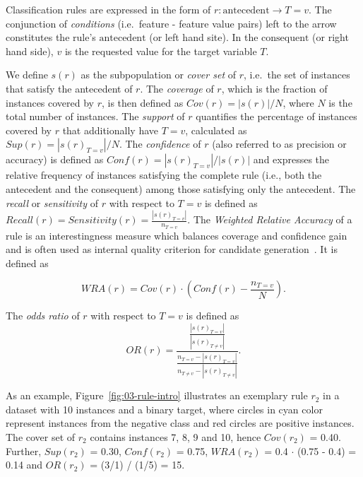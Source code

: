 \documentclass[
  oneside]{book}
\begin{document}
Classification rules are expressed in the form of \(r: \text{antecedent} \longrightarrow T=v\).
The conjunction of \emph{conditions} (i.e.~feature - feature value pairs) left to the arrow constitutes the rule's \(\text{antecedent}\) (or left hand site).
In the \(\text{consequent}\) (or right hand side), \(v\) is the requested value for the target variable \(T\).

We define \(s(r)\) as the subpopulation or \emph{cover set} of \(r\), i.e.~the set of instances that satisfy the antecedent of \(r\).
The \emph{coverage} of \(r\), which is the fraction of instances covered by \(r\), is then defined as \(Cov(r)=|s(r)|/N\), where \(N\) is the total number of instances.
The \emph{support} of \(r\) quantifies the percentage of instances covered by \(r\) that additionally have \(T=v\), calculated as \(Sup(r)=|s(r)_{T=v}|/N\).
The \emph{confidence} of \(r\) (also referred to as precision or accuracy) is defined as \(Conf(r)= |s(r)_{T=v}|/|s(r)|\) and expresses the relative frequency of instances satisfying the complete rule (i.e., both the antecedent and the consequent) among those satisfying only the antecedent.
The \emph{recall} or \emph{sensitivity} of \(r\) with respect to \(T=v\) is defined as \(Recall(r)=Sensitivity(r)=\frac{|s(r)_{T=v}|}{n_{T=v}}\).
The \emph{Weighted Relative Accuracy} of a rule is an interestingness measure which balances coverage and confidence gain and is often used as internal quality criterion for candidate generation~\autocite{Herrera11}.
It is defined as

\begin{equation}
WRA(r) = Cov(r)\cdot \left(Conf(r)-\frac{n_{T=v}}{N} \right).
\label{eq:03-wra}
\end{equation}

The \emph{odds ratio} of \(r\) with respect to \(T=v\) is defined as
\begin{equation}
OR(r) = \frac{\frac{ |s(r)_{T=v}| }{|s(r)_{T\neq v}|} }{ \frac{n_{T=v} -  |s(r)_{T=v}| }{ n_{T\neq v} -  |s(r)_{T\neq v}|} }.
\label{eq:03-odds}
\end{equation}

As an example, Figure~\ref{fig:03-rule-intro} illustrates an exemplary rule \(r_2\) in a dataset with 10 instances and a binary target, where circles in cyan color represent instances from the negative class and red circles are positive instances.
The cover set of \(r_2\) contains instances 7, 8, 9 and 10, hence \(Cov(r_2)\) = 0.40.
Further, \(Sup(r_2)\) = 0.30, \(Conf(r_2)\) = 0.75, \(WRA(r_2)\) = 0.4 \(\cdot\) (0.75 - 0.4) = 0.14 and \(OR(r_2)\) = (3/1) / (1/5) = 15.
\end{document}
